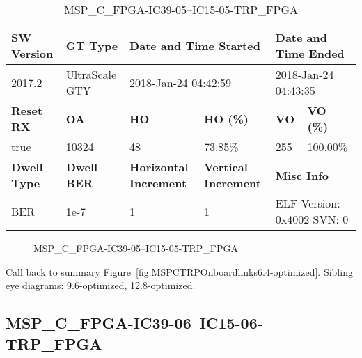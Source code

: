 \begin{table}[h]
\centering
\caption{MSP\_C\_FPGA-IC39-05--IC15-05-TRP\_FPGA}
\label{tab:MSPCFPGAIC3905IC1505TRPFPGA6.4-optimized}
\begin{tabular}{@{}|l|l|l|l|l|l|@{}}
\toprule
\textbf{SW Version}                & \textbf{GT Type}   & \multicolumn{2}{l|}{\textbf{Date and Time Started}}            & \multicolumn{2}{l|}{\textbf{Date and Time Ended}}        \\ \midrule
2017.2                       & UltraScale GTY          & \multicolumn{2}{l|}{2018-Jan-24 04:42:59}                   & \multicolumn{2}{l|}{2018-Jan-24 04:43:35}               \\ \midrule
\textbf{Reset RX}                  & \textbf{OA} & \textbf{HO}   & \textbf{HO (\%)} & \textbf{VO} & \textbf{VO (\%)} \\ \midrule
true & 10324        & 48          & 73.85\%        & 255        & 100.00\%       \\ \midrule
\textbf{Dwell Type}                & \textbf{Dwell BER} & \textbf{Horizontal Increment} & \textbf{Vertical Increment}    & \multicolumn{2}{l|}{\textbf{Misc Info}}                  \\ \midrule
BER                            & 1e-7        & 1        & 1           & \multicolumn{2}{l|}{ELF Version: 0x4002 SVN: 0}                         \\ \bottomrule
\end{tabular}
\end{table}

\begin{figure}[h]
\caption{MSP\_C\_FPGA-IC39-05--IC15-05-TRP\_FPGA} \label{fig:MSPCFPGAIC3905IC1505TRPFPGA6.4-optimized}
\end{figure}

Call back to summary Figure~\ref{fig:MSPCTRPOnboardlinks6.4-optimized}.
Sibling eye diagrams: \hyperref[sec:MSPCFPGAIC3905IC1505TRPFPGA9.6-optimized]{9.6-optimized}, \hyperref[sec:MSPCFPGAIC3905IC1505TRPFPGA12.8-optimized]{12.8-optimized}.

\clearpage
\newpage


\subsection{MSP\_C\_FPGA-IC39-06--IC15-06-TRP\_FPGA}\label{sec:MSPCFPGAIC3906IC1506TRPFPGA6.4-optimized}

